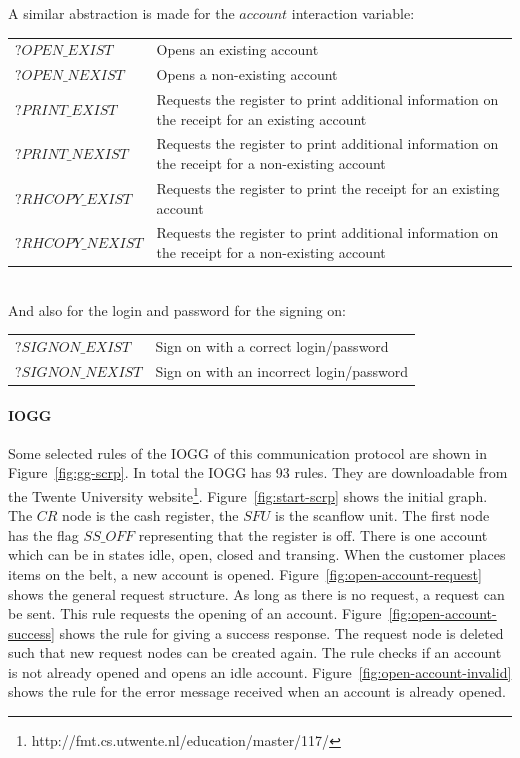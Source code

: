 A similar abstraction is made for the $\mathit{account}$ interaction variable: 
\vspace{5px}\\
\begin{tabular}{lp{310px}}
$\mathit{?OPEN\_EXIST}$ & Opens an existing account \\
$\mathit{?OPEN\_NEXIST}$ & Opens a non-existing account \\
$\mathit{?PRINT\_EXIST}$ & Requests the register to print additional information on the receipt for an existing account \\
$\mathit{?PRINT\_NEXIST}$ & Requests the register to print additional information on the receipt for a non-existing account \\
$\mathit{?RHCOPY\_EXIST}$ & Requests the register to print the receipt for an existing account \\
$\mathit{?RHCOPY\_NEXIST}$ & Requests the register to print additional information on the receipt for a non-existing account \\
\end{tabular}
\vspace{5px} \\
And also for the login and password for the signing on: 
\vspace{5px}\\
\begin{tabular}{ll}
$\mathit{?SIGNON\_EXIST}$ & Sign on with a correct login/password \\
$\mathit{?SIGNON\_NEXIST}$ & Sign on with an incorrect login/password \\
\end{tabular}

\paragraph*{IOGG} Some selected rules of the IOGG of this communication protocol are shown in Figure~\ref{fig:gg-scrp}. In total the IOGG has 93 rules. They are downloadable from the Twente University website\footnote{http://fmt.cs.utwente.nl/education/master/117/}. Figure~\ref{fig:start-scrp} shows the initial graph. The $CR$ node is the cash register, the $SFU$ is the scanflow unit. The first node has the flag $\mathit{SS\_OFF}$ representing that the register is off. There is one account which can be in states idle, open, closed and transing. When the customer places items on the belt, a new account is opened. Figure~\ref{fig:open-account-request} shows the general request structure. As long as there is no request, a request can be sent. This rule requests the opening of an account. Figure~\ref{fig:open-account-success} shows the rule for giving a success response. The request node is deleted such that new request nodes can be created again. The rule checks if an account is not already opened and opens an idle account. Figure~\ref{fig:open-account-invalid} shows the rule for the error message received when an account is already opened. 

